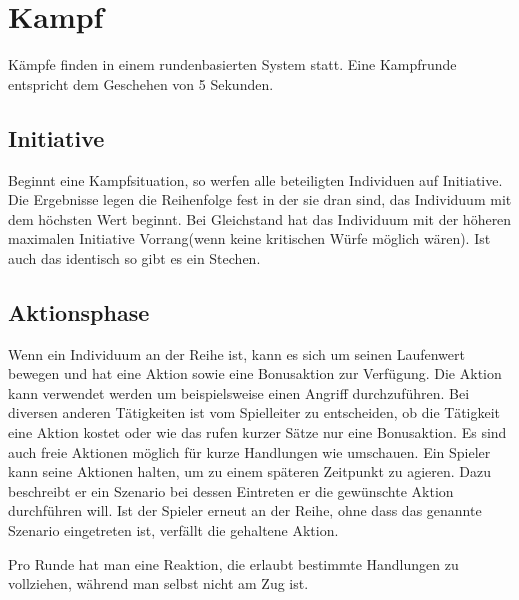 \documentclass[../../Heldenanleitung2]{subfiles}
\begin{document}
\chapter{Kampf}

Kämpfe finden in einem rundenbasierten System statt. Eine Kampfrunde entspricht dem Geschehen von 5 Sekunden.

\section{Initiative}
Beginnt eine Kampfsituation, so werfen alle beteiligten Individuen auf Initiative. Die Ergebnisse legen die Reihenfolge fest in der sie dran sind, das Individuum mit dem höchsten Wert beginnt. Bei Gleichstand hat das Individuum mit der höheren maximalen Initiative Vorrang(wenn keine kritischen Würfe möglich wären). Ist auch das identisch so gibt es ein Stechen.

\section{Aktionsphase}
Wenn ein Individuum an der Reihe ist, kann es sich um seinen Laufenwert bewegen und hat eine Aktion sowie eine Bonusaktion zur Verfügung. Die Aktion kann verwendet werden um beispielsweise einen Angriff durchzuführen. Bei diversen anderen Tätigkeiten ist vom Spielleiter zu entscheiden, ob die Tätigkeit eine Aktion kostet oder wie das rufen kurzer Sätze nur eine Bonusaktion. Es sind auch freie Aktionen möglich für kurze Handlungen wie umschauen. Ein Spieler kann seine Aktionen halten, um zu einem späteren Zeitpunkt zu agieren. Dazu beschreibt er ein Szenario bei dessen Eintreten er die gewünschte Aktion durchführen will. Ist der Spieler erneut an der Reihe, ohne dass das genannte Szenario eingetreten ist, verfällt die gehaltene Aktion.

Pro Runde hat man eine Reaktion, die erlaubt bestimmte Handlungen zu vollziehen, während man selbst nicht am Zug ist.
\end{document}
